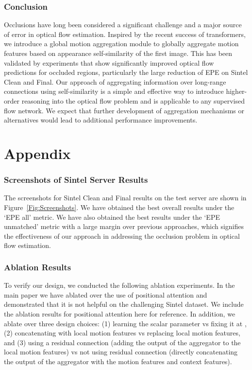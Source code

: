 \documentclass[10pt,twocolumn,letterpaper]{article}
\begin{document}
\section{Conclusion}
Occlusions have long been considered a significant challenge and a major source of error in optical flow estimation. 
Inspired by the recent success of transformers, we introduce a global motion aggregation module to globally
aggregate motion features based on appearance self-similarity of the first image. This has been validated
by experiments that show significantly improved optical flow predictions for occluded regions, particularly the
large reduction of EPE on Sintel Clean and Final.
Our approach of aggregating information over long-range connections using self-similarity is a
simple and effective way to introduce higher-order reasoning into the optical flow problem and
is applicable to any supervised flow network. We expect that further development of aggregation mechanisms
or alternatives would lead to additional performance improvements.


{\small


}

\clearpage



\part*{Appendix}
\setcounter{section}{0}

\section{Screenshots of Sintel Server Results}
The screenshots for Sintel Clean and Final results on the test server are shown in 
Figure~\ref{Fig:Screenshots}. We have obtained the best overall results under the
`EPE all' metric. We have also obtained the best results under the `EPE unmatched' metric
with a large margin over previous approaches, which signifies the effectiveness of our
approach in addressing the occlusion problem in optical flow estimation. 

\section{Ablation Results}
To verify our design, we conducted the following ablation experiments. In the main paper we have ablated over the use
of positional attention and demonstrated that it is not helpful on the challenging Sintel dataset. We include
the ablation results for positional attention here for reference. In addition, we ablate over
three design choices: (1) learning the  scalar parameter  vs fixing it at , (2) concatenating with 
local motion features vs replacing local motion features, and (3) using a residual connection (adding the output of 
the aggregator to the local motion features) vs not using residual connection (directly concatenating the output of 
the aggregator with the motion features and context features). 
\end{document}
